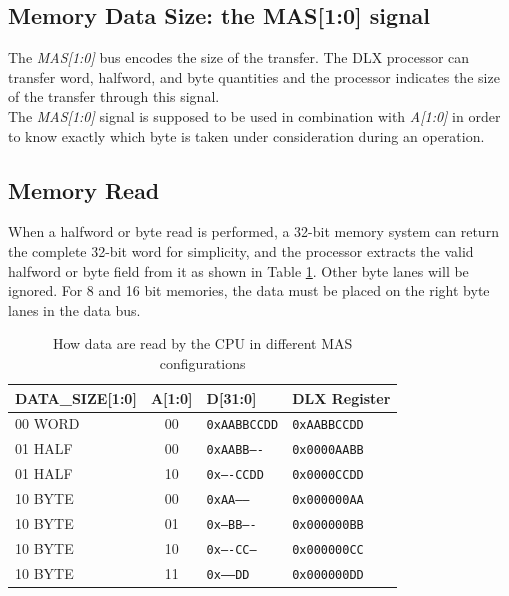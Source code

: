 \subsection{Memory Data Size: the MAS[1:0] signal}
\label{mas}

The \emph{MAS[1:0]} bus encodes the size of the transfer. The DLX processor can transfer word, halfword, and byte quantities and the processor indicates the size of the transfer through this signal.\\

The \emph{MAS[1:0]} signal is supposed to be used in combination with \emph{A[1:0]} in order to know exactly which byte is taken under consideration during an operation.

\subsection{Memory Read}

When a halfword or byte read is performed, a 32-bit memory system can return the complete 32-bit word for simplicity, and the processor extracts the valid halfword or byte field from it as shown in Table \ref{table:memory_read_configuration}. Other byte lanes will be ignored. For 8 and 16 bit memories, the data must be placed on the right byte lanes in the data bus.

\begin{table}[H]
    \centering
    \begin{tabular}{|l|c|l|l|}
    \hline
        DATA\_SIZE[1:0] & A[1:0] & D[31:0] & DLX Register \\ \hline
        00 WORD & 00 & \texttt{0xAABBCCDD} & \texttt{0xAABBCCDD} \\ \hline
        01 HALF & 00 & \texttt{0xAABB----} & \texttt{0x0000AABB} \\ \hline
        01 HALF & 10 & \texttt{0x----CCDD} & \texttt{0x0000CCDD} \\ \hline
        10 BYTE & 00 & \texttt{0xAA------} & \texttt{0x000000AA} \\ \hline
        10 BYTE & 01 & \texttt{0x--BB----} & \texttt{0x000000BB} \\ \hline
        10 BYTE & 10 & \texttt{0x----CC--} & \texttt{0x000000CC} \\ \hline
        10 BYTE & 11 & \texttt{0x------DD} & \texttt{0x000000DD} \\ \hline
    \end{tabular}
    \caption{How data are read by the CPU in different MAS configurations}
    \label{table:memory_read_configuration}
\end{table}

